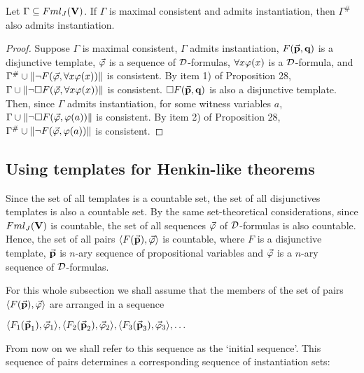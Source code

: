 \begin{pro}Let $\Gamma \subseteq Fml_{J}(\textbf{V})$. If $\Gamma$ is maximal consistent and admits instantiation, then $\Gamma^{\#}$ also admits instantiation.
\end{pro}

\begin{proof} 
	Suppose $\Gamma$ is maximal consistent, $\Gamma$ admits instantiation, $F(\vec{\textbf{p}}, \textbf{q})$ is a disjunctive template, $\vec{\varphi}$ is a sequence of $\mathcal{D}$-formulas, $\forall x \varphi(x)$ is a $\mathcal{D}$-formula, and $\Gamma^{\#}\cup \Arrowvert \neg F(\vec{\varphi},\forall x\varphi(x)) \Arrowvert$ is consistent. By item 1) of Proposition 28, $\Gamma\cup \Arrowvert \neg\Box F(\vec{\varphi},\forall x\varphi(x)) \Arrowvert$ is consistent.  $\Box F(\vec{\textbf{p}}, \textbf{q})$ is also a disjunctive template. Then, since $\Gamma$ admits instantiation, for some witness variables $a$,  $\Gamma\cup \Arrowvert \neg\Box F(\vec{\varphi},\varphi(a)) \Arrowvert$ is consistent. By item 2) of Proposition 28, $\Gamma^{\#}\cup \Arrowvert \neg F(\vec{\varphi},\varphi(a)) \Arrowvert$ is consistent.       
\end{proof}


\subsection{Using templates for Henkin-like theorems}

\qquad Since the set of all templates is a countable set, the set of all disjunctives templates is also a countable set. By the same set-theoretical considerations, since $Fml_{J}(\textbf{V})$ is countable, the set of all sequences $\vec{\varphi}$ of $\mathcal{D}$-formulas is also countable. Hence, the set of all pairs $\langle F(\vec{\textbf{p}}), \vec{\varphi} \rangle$ is countable, where $F$ is a disjunctive template, $\vec{\textbf{p}}$ is $n$-ary sequence of propositional variables and $\vec{\varphi}$ is a $n$-ary sequence of $\mathcal{D}$-formulas.

\qquad For this whole subsection we shall assume that the members of the set of pairs $\langle F(\vec{\textbf{p}}), \vec{\varphi} \rangle$ are arranged in a sequence

\begin{center}
	$\langle F_{1}(\vec{\textbf{p}}_{1}), \vec{\varphi}_{1} \rangle, \langle F_{2}(\vec{\textbf{p}}_{2}), \vec{\varphi}_{2} \rangle, \langle F_{3}(\vec{\textbf{p}}_{3}), \vec{\varphi}_{3} \rangle, \dots $
\end{center}  

\qquad From now on we shall refer to this sequence as the `initial sequence'. This sequence of pairs determines a corresponding sequence of instantiation sets:

